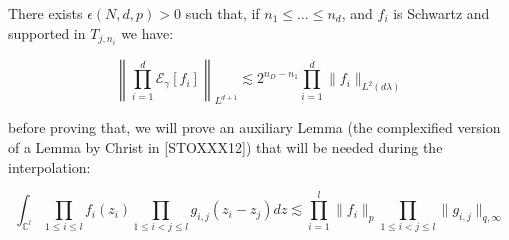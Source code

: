 	\begin{lemma}
		There exists $\epsilon(N,d,p)>0$ such that, if $n_1 \le \dots \le n_d$, and $f_i$ is Schwartz and supported in $T_{j,n_i}$ we have:

		\begin{equation}
			\left \|\prod_{i=1}^d \mathcal E_\gamma [f_i]\right\|_{L^{d+1}} \lesssim 2^{n_D-n_1} \prod_{i=1}^d \|f_i\|_{L^2(d\lambda)}
		\end{equation}
	\end{lemma}
	

	before proving that, we will prove an auxiliary Lemma (the complexified version of a Lemma by Christ in [STOXXX12]) that will be needed during the interpolation:

	\begin{equation}
		\int_{\mathbb C^l} \prod_{1\le i\le l}f_i(z_i) \prod_{1\le i<j\le l} g_{i,j}(z_i-z_j) dz \lesssim \prod_{i=1}^l \|f_i\|_p \prod_{1\le i<j\le l} \|g_{i,j}\|_{q,\infty}
	\end{equation}

